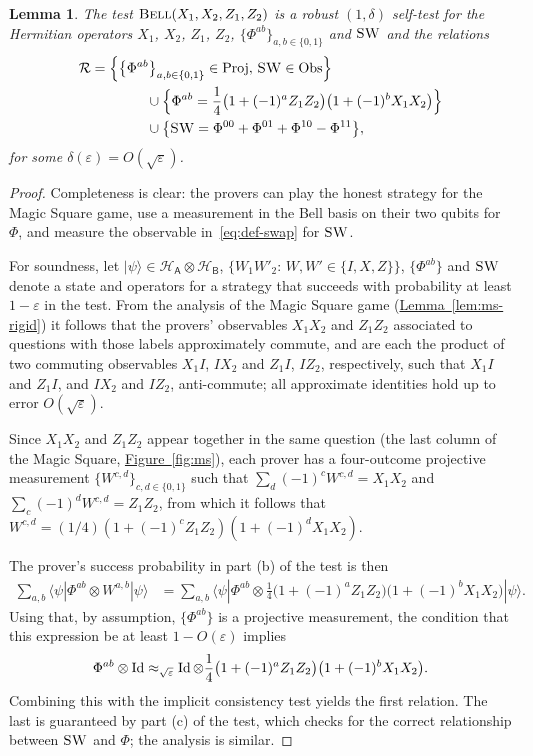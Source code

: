 \documentclass[11pt]{article}
\numberwithin{equation}{section}
\newtheorem{lemma}[theorem]{Lemma}
\theoremstyle{definition}
\theoremstyle{plain}
\newcommand{\expref}[2]{\hyperref[#2]{#1~\ref{#2}}}
\newcommand{\ket}[1]{|#1\rangle}
\newcommand{\bra}[1]{\langle#1|}
\newcommand{\Id}{\ensuremath{\mathop{\rm Id}\nolimits}}
\newcommand{\setft}[1]{\mathrm{#1}}
\newcommand{\Proj}{\setft{Proj}}
\newcommand{\Obs}{\setft{Obs}}
\newcommand{\reg}[1]{{\textsf{#1}}}
\newcommand{\mH}{\mathcal{H}}
\newcommand{\eps}{\varepsilon}
\newcommand{\bellt}{\textsc{Bell}}
\newcommand{\SWAP}{\textsc{SW}}
\begin{document}
\begin{lemma}\label{lem:bell-rigid-test}
The test $\bellt(X_1,X_2,Z_1,Z_2)$ is a robust $(1,\delta)$ self-test for
the %
Hermitian operators %
$X_1$, $X_2$, $Z_1$, $Z_2$,  %
$\{ \Phi^{ab}\}_{a,b\in\{0,1\}}$ and $\SWAP$ and the relations 
\begin{align*}
\mathcal{R}&= \Big\{\big\{\Phi^{ab}\big\}_{a,b\in\{0,1\}}\in\Proj,\,
  \SWAP\in\Obs\Big\}\\
  &\qquad\qquad\cup \Big\{\Phi^{ab} = \frac{1}{4}\big(1+(-1)^a Z_1Z_2\big)\big(1+(-1)^bX_1X_2\big) \Big\}\\
&\qquad\qquad \cup \big\{\SWAP = \Phi^{00}+\Phi^{01}+\Phi^{10}-\Phi^{11}\big\},
\end{align*}
 for some $\delta(\eps) = O(\sqrt{\eps})$.
\end{lemma}


\begin{proof}
Completeness is clear: the provers can play the honest strategy for the Magic Square game, use a measurement in the Bell basis on their two qubits for $\Phi$, and measure the  observable in~\eqref{eq:def-swap} for $\SWAP$. 

For soundness, let $\ket{\psi}\in\mH_\reg{A}\otimes \mH_\reg{B}$, $\{W_1W'_2:\, W,W'\in\{I,X,Z\}\}$, $\{\Phi^{ab}\}$ and $\SWAP$ denote a state and operators for a strategy that succeeds with probability at least $1-\eps$ in the test. From the analysis of the Magic Square game (\expref{Lemma}{lem:ms-rigid}) it follows that the provers' observables $X_1X_2$ and $Z_1Z_2$ associated to questions with those  labels approximately commute, and are each the product of two commuting observables $X_1I$, $IX_2$ and $Z_1I$, $IZ_2$, %
 respectively, such that $X_1I$ and $Z_1I$, and $IX_2$ and $IZ_2$, anti-commute; all approximate identities hold up to error $O(\sqrt{\eps})$. 

Since $X_1X_2$ and $Z_1Z_2$ appear together in the same question (the last column of the Magic Square, \expref{Figure}{fig:ms}), each prover has a four-outcome projective measurement $\{W^{c,d}\}_{c,d\in\{0,1\}}$ such that $\sum_d (-1)^c W^{c,d} = X_1X_2$ and $\sum_c (-1)^dW^{c,d} = Z_1Z_2$, from which it follows that $W^{c,d} = (1/4)(1+(-1)^c Z_1Z_2)(1+(-1)^d X_1X_2)$. 

The prover's success probability in part (b) of the test is then
\begin{align*}
\sum_{a,b} \bra{\psi} \Phi^{ab} \otimes W^{a,b} \ket{\psi} &= \sum_{a,b} \bra{\psi} \Phi^{ab} \otimes \frac{1}{4} \big(1+(-1)^a Z_1Z_2\big)\big(1+(-1)^bX_1X_2\big) \ket{\psi}.
\end{align*}
Using that, by assumption, $\{\Phi^{ab}\}$ is a projective measurement, the condition that this expression be at least $1-O(\eps)$ implies 
$$\Phi^{ab} \otimes \Id \approx_{\sqrt{\eps}}\Id \otimes \frac{1}{4}\big(1+(-1)^a Z_1Z_2\big)\big(1+(-1)^bX_1X_2\big).$$ 
Combining this with the implicit consistency test yields the first relation. The last is guaranteed by part (c) of the test, which checks for the correct relationship between $\SWAP$ and $\Phi$; the analysis is similar.  
\end{proof}
\end{document}
